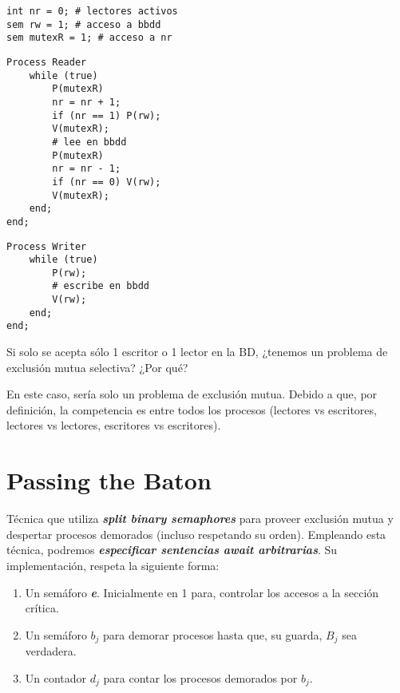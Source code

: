 \documentclass[a4paper, 10pt]{report}
\begin{document}
\begin{lstlisting}
int nr = 0; # lectores activos
sem rw = 1; # acceso a bbdd
sem mutexR = 1; # acceso a nr
\end{lstlisting}
\noindent
\begin{minipage}{0.5\textwidth}
\begin{lstlisting}[firstnumber=4]
Process Reader
	while (true)
		P(mutexR)
		nr = nr + 1;
		if (nr == 1) P(rw);
		V(mutexR);
		# lee en bbdd
		P(mutexR)
		nr = nr - 1;
		if (nr == 0) V(rw);
		V(mutexR);
	end;
end;
\end{lstlisting}
\end{minipage}
\noindent
\begin{minipage}{0.5\textwidth}
\begin{lstlisting}[firstnumber=17]
Process Writer
	while (true)
		P(rw);
		# escribe en bbdd
		V(rw);
	end;
end;
\end{lstlisting}
\end{minipage}
\begin{basic_box}
	 Si solo se acepta sólo 1 escritor  o 1 lector en la BD, ¿tenemos un problema de exclusión mutua selectiva? ¿Por qué?

	En este caso, sería solo un problema de exclusión mutua. Debido a que, por definición, la competencia es entre todos los procesos (lectores vs escritores, lectores vs lectores, escritores vs escritores).
\end{basic_box}

\section{Passing the Baton}

Técnica que utiliza \textbf{\emph{split binary semaphores}} para proveer exclusión mutua y despertar procesos demorados (incluso respetando su orden). Empleando esta técnica, podremos \textbf{\emph{especificar sentencias await arbitrarias}}. Su implementación, respeta la siguiente forma:

\begin{enumerate}
	\item Un semáforo \textbf{\emph{e}}. Inicialmente en 1 para, controlar los accesos a la sección crítica.
	\item Un semáforo \textbf{\emph{$b_j$}} para demorar procesos hasta que, su guarda, \textbf{\emph{$B_j$}} sea verdadera.
	\item Un contador \textbf{\emph{$d_j$}} para contar los procesos demorados por \textbf{\emph{$b_j$}}.
\end{enumerate}
\end{document}
